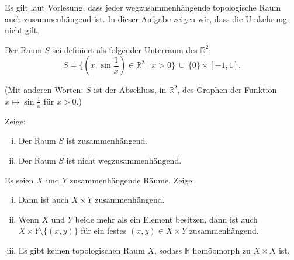 \begin{aufgabe}
Es gilt laut Vorlesung, dass jeder wegzusammenhängende topologische Raum auch zusammenhängend ist. In dieser Aufgabe zeigen wir, dass die Umkehrung nicht gilt.
 
Der Raum $S$ sei definiert als folgender Unterraum
des $\mathbb{R}^2$:
\[S = \Big\{ \left(x,\sin \frac{1}{x}\right) \in \mathbb{R}^2 \mid x > 0\Big\}
\ \cup \ \{0\} \times [-1,1].\]

\hspace*{-1cm}

(Mit anderen Worten: $S$ ist der Abschluss, in $\mathbb{R}^2$, des Graphen
der Funktion $x \mapsto \sin \frac{1}{x}$ für $x > 0$.)

Zeige: 
\begin{enumerate}[i)]
\item Der Raum $S$ ist zusammenhängend.
\item Der Raum $S$ ist nicht wegzusammenhängend.
\end{enumerate}
\end{aufgabe}

\begin{aufgabe}
Es seien $X$ und $Y$ zusammenhängende Räume. Zeige:
\begin{enumerate}[i)]
	\item Dann ist auch $X\times Y$ zusammenhängend.
	\item Wenn $X$ und $Y$ beide mehr als ein Element besitzen, dann ist auch $X\times Y\setminus \{(x,y)\}$ für ein festes $(x,y)\in X\times Y$ zusammenhängend.
	\item Es gibt keinen topologischen Raum $X$, sodass $\mathbb R$ homöomorph zu $X\times X$ ist.
\end{enumerate}
\end{aufgabe}

